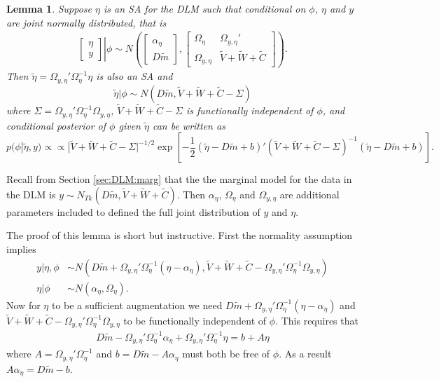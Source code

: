 \documentclass[12pt]{article}
\newtheorem{lem}[thm]{Lemma}
\begin{document}
\begin{lem}\label{noSA}
Suppose $\eta$ is an SA for the DLM such that conditional on $\phi$, $\eta$ and $y$ are joint normally distributed, that is
\begin{align*}
 \left. \begin{bmatrix}\eta \\ y \end{bmatrix}\right|\phi \sim N\left(\begin{bmatrix} \alpha_\eta \\ D\tilde{m} \end{bmatrix}, \begin{bmatrix}
   \Omega_\eta & \Omega_{y,\eta}' \\
   \Omega_{y,\eta} & \tilde{V} + \tilde{W} + \tilde{C} \end{bmatrix}\right).
\end{align*}
Then $\tilde{\eta}=\Omega_{y,\eta}'\Omega_{\eta}^{-1}\eta$ is also an SA and
\[
\tilde{\eta}|\phi \sim N(D\tilde{m},\tilde{V} + \tilde{W} + \tilde{C} - \Sigma)
\]
where $\Sigma=\Omega_{y,\eta}'\Omega_{\eta}^{-1}\Omega_{y,\eta}$, $\tilde{V} + \tilde{W} + \tilde{C} - \Sigma$ is functionally independent of $\phi$, and conditional posterior of $\phi$ given $\tilde{\eta}$ can be written as
\[
p(\phi|\tilde{\eta},y) \propto \propto |\tilde{V} + \tilde{W} + \tilde{C} - \Sigma|^{-1/2}\exp\left[-\frac{1}{2}(\tilde{\eta} - D\tilde{m} + b)'(\tilde{V} + \tilde{W} + \tilde{C} - \Sigma)^{-1}(\tilde{\eta} - D\tilde{m} + b)\right].
\]
\end{lem}
Recall from Section \ref{sec:DLM:marg} that the the marginal model for the data in the DLM is $y\sim N_{Tk}(D\tilde{m}, \tilde{V} + \tilde{W} + \tilde{C})$. Then $\alpha_\eta$, $\Omega_\eta$ and $\Omega_{y,\eta}$ are additional parameters included to defined the full joint distribution of $y$ and $\eta$.

The proof of this lemma is short but instructive. First the normality assumption implies
\begin{align*}
  y|\eta,\phi &\sim N(D\tilde{m} + \Omega_{y,\eta}'\Omega_\eta^{-1}(\eta - \alpha_\eta), \tilde{V} + \tilde{W} + \tilde{C}- \Omega_{y,\eta}'\Omega_{\eta}^{-1}\Omega_{y,\eta})\\
  \eta|\phi &\sim N(\alpha_\eta, \Omega_\eta).
\end{align*}
Now for $\eta$ to be a sufficient augmentation we need $D\tilde{m} + \Omega_{y,\eta}'\Omega_\eta^{-1}(\eta - \alpha_\eta)$ and $\tilde{V} + \tilde{W} + \tilde{C} - \Omega_{y,\eta}'\Omega_{\eta}^{-1}\Omega_{y,\eta}$ to be functionally independent of $\phi$. This requires that
\begin{align*}
  D\tilde{m} - \Omega_{y,\eta}'\Omega_\eta^{-1}\alpha_\eta + \Omega_{y,\eta}'\Omega_\eta^{-1}\eta  = b + A\eta
\end{align*}
where $A=\Omega_{y,\eta}'\Omega_\eta^{-1}$ and $b=D\tilde{m} - A\alpha_\eta$ must both be free of $\phi$. As a result $A\alpha_\eta = D\tilde{m} - b$.
\end{document}
